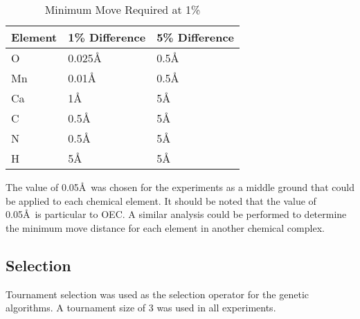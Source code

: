 \begin{table}
	\centering
	\begin{tabular}{ | l | l | l | }
		\hline
		Element & 1\% Difference & 5\% Difference \\ \hline
		O & 0.025\AA & 0.5\AA \\ \hline
		Mn & 0.01\AA & 0.5\AA \\ \hline
		Ca & 1\AA & 5\AA \\ \hline
		C & 0.5\AA & 5\AA \\ \hline
		N & 0.5\AA & 5\AA \\ \hline
		H & 5\AA & 5\AA \\ \hline
	\end{tabular}
	\caption{Minimum Move Required at 1\%}
	\label{table:minMove}
\end{table}

The value of 0.05\AA\ was chosen for the experiments as a middle ground that could be applied to each chemical element. It should be noted that the value of 0.05\AA\ is particular to OEC. A similar analysis could be performed to determine the minimum move distance for each element in another chemical complex.

\subsection{Selection}

Tournament selection was used as the selection operator for the genetic algorithms. A tournament size of 3 was used in all experiments.